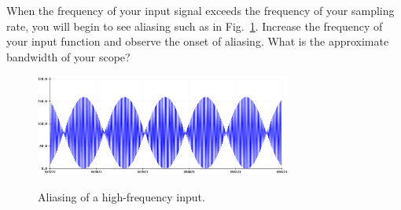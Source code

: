 \documentclass[12pt]{article}
\begin{document}
When the frequency of your input signal exceeds the frequency of your sampling rate, you will begin to see aliasing such as in Fig.~\ref{fig:aliasing}.  Increase the frequency of your input function and observe the onset of aliasing.  What is the approximate bandwidth of your scope? 
\begin{figure}[htbp]
\begin{center}
{\includegraphics[width=0.75\textwidth]{figs/aliasing.png}}
\end{center}
\caption{\label{fig:aliasing} Aliasing of a high-frequency input.}
\end{figure}
\end{document}
